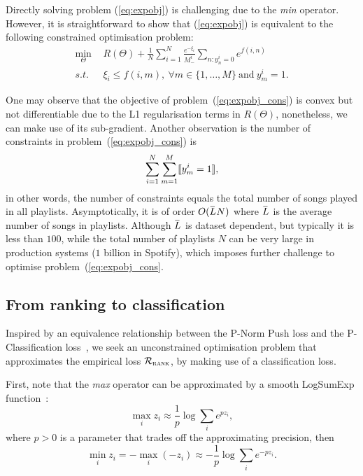 Directly solving problem (\ref{eq:expobj}) is challenging due to the \emph{min} operator.
However, it is straightforward to show that (\ref{eq:expobj}) is equivalent to the following constrained optimisation problem:
\begin{equation}
\label{eq:expobj_cons}
\begin{aligned}
\min_{\Theta} \ \, & R(\Theta) + \frac{1}{N} \sum_{i=1}^N \frac{e^{-\xi_i}}{M_-^i} \sum_{n: y_n^i = 0} e^{f(i, n)} \\
s.t. \ \, & \xi_i \le f(i, m), \ \forall m \in \{1,\dots,M\} \ \text{and} \ y_m^i = 1.
\end{aligned}
\end{equation}

One may observe that the objective of problem~(\ref{eq:expobj_cons}) is convex but not differentiable due to the L1 regularisation terms in $R(\Theta)$,
nonetheless, we can make use of its sub-gradient.
Another observation is the number of constraints in problem~(\ref{eq:expobj_cons}) is 
$$
\sum_{i=1}^N \sum_{m=1}^M \llbracket y_m^i = 1 \rrbracket,
$$
in other words, the number of constraints equals the total number of songs played in all playlists.
Asymptotically, it is of order $O(\widebar{L} N)$ where $\widebar{L}$ is the average number of songs in playlists.
Although $\widebar{L}$ is dataset dependent, but typically it is less than $100$, 
while the total number of playlists $N$ can be very large in production systems (\eg $1$ billion in Spotify),
which imposes further challenge to optimise problem~(\ref{eq:expobj_cons}.


\subsection{From ranking to classification}

Inspired by an equivalence relationship between the P-Norm Push loss and the P-Classification loss~\cite{},
we seek an unconstrained optimisation problem that approximates the empirical loss $\mathcal{R}_\textsc{rank}$,
by making use of a classification loss.

First, note that the \emph{max} operator can be approximated by a smooth LogSumExp function~\cite{}:
$$
\max_i z_i \approx \frac{1}{p} \log \sum_i e^{p z_i},
$$
where $p > 0$ is a parameter that trades off the approximating precision, then
$$
\min_i z_i = -\max_i (-z_i) \approx -\frac{1}{p} \log \sum_i e^{-p z_i}.
$$

